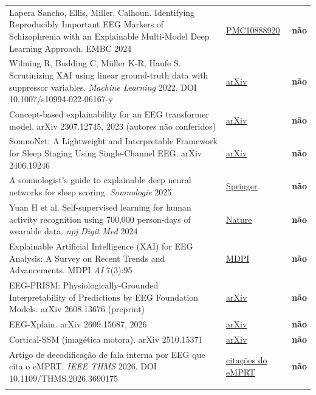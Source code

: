 \documentclass[11pt,a4paper]{article}
\begin{document}
{\begin{xltabular}{\linewidth}{>{\raggedright\arraybackslash}X>{\raggedright\arraybackslash}X>{\raggedright\arraybackslash}X}
Lapera Sancho, Ellis, Miller, Calhoun. Identifying Reproducibly Important EEG Markers of Schizophrenia with an Explainable Multi-Model Deep Learning Approach. EMBC 2024 & \href{https://pmc.ncbi.nlm.nih.gov/articles/PMC10888920/}{PMC10888920} & \textbf{não} \\ \addlinespace[1pt]
Wilming R, Budding C, Müller K-R, Haufe S. Scrutinizing XAI using linear ground-truth data with suppressor variables. \textit{Machine Learning} 2022. DOI 10.1007/s10994-022-06167-y & \href{https://arxiv.org/abs/2111.07473v2}{arXiv} & \textbf{não} \\ \addlinespace[1pt]
Concept-based explainability for an EEG transformer model. arXiv 2307.12745, 2023 (autores não conferidos) & \href{https://arxiv.org/pdf/2307.12745}{arXiv} & \textbf{não} \\ \addlinespace[1pt]
SomnoNet: A Lightweight and Interpretable Framework for Sleep Staging Using Single-Channel EEG. arXiv 2406.19246 & \href{https://arxiv.org/pdf/2406.19246}{arXiv} & \textbf{não} \\ \addlinespace[1pt]
A somnologist's guide to explainable deep neural networks for sleep scoring. \textit{Somnologie} 2025 & \href{https://link.springer.com/article/10.1007/s11818-025-00504-8}{Springer} & \textbf{não} \\ \addlinespace[1pt]
Yuan H et al. Self-supervised learning for human activity recognition using 700,000 person-days of wearable data. \textit{npj Digit Med} 2024 & \href{https://www.nature.com/articles/s41746-024-01062-3}{Nature} & \textbf{não} \\ \addlinespace[1pt]
Explainable Artificial Intelligence (XAI) for EEG Analysis: A Survey on Recent Trends and Advancements. MDPI \textit{AI} 7(3):95 & \href{https://www.mdpi.com/2673-2688/7/3/95}{MDPI} & \textbf{não} \\ \addlinespace[1pt]
EEG-PRISM: Physiologically-Grounded Interpretability of Predictions by EEG Foundation Models. arXiv 2608.13676 (preprint) & \href{https://arxiv.org/pdf/2608.13676}{arXiv} & \textbf{não} \\ \addlinespace[1pt]
EEG-Xplain. arXiv 2609.15687, 2026 & \href{https://arxiv.org/abs/2609.15687}{arXiv} & \textbf{não} \\ \addlinespace[1pt]
Cortical-SSM (imagética motora). arXiv 2510.15371 & \href{https://arxiv.org/abs/2510.15371}{arXiv} & \textbf{não} \\ \addlinespace[1pt]
Artigo de decodificação de fala interna por EEG que cita o eMPRT. \textit{IEEE THMS} 2026. DOI 10.1109/THMS.2026.3690175 & \href{https://api.semanticscholar.org/graph/v1/paper/arXiv:2401.06465/citations}{citações do eMPRT} & \textbf{não} \\ \addlinespace[1pt]
\bottomrule
\end{xltabular}}
\end{document}
